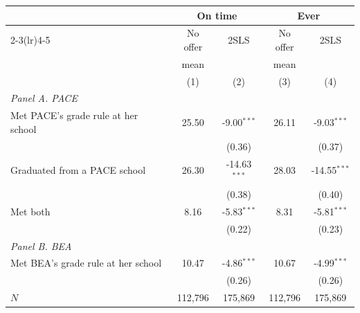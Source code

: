 \begin{tabular}{lcccc}
\toprule
 & \multicolumn{2}{c}{On time} & \multicolumn{2}{c}{Ever}\\
\cmidrule(lr){2-3}\cmidrule(lr){4-5}
 & No offer & 2SLS & No offer & 2SLS\\
 & mean &  & mean & \\
 & (1) & (2) & (3) & (4)\\
\midrule
\multicolumn{5}{l}{\textit{Panel A. PACE}}\\
\quad Met PACE's grade rule at her school & 25.50 & -9.00$^{***}$ & 26.11 & -9.03$^{***}$\\
 &  & (0.36) &  & (0.37)\\
\quad Graduated from a PACE school & 26.30 & -14.63$^{***}$ & 28.03 & -14.55$^{***}$\\
 &  & (0.38) &  & (0.40)\\
\quad Met both & 8.16 & -5.83$^{***}$ & 8.31 & -5.81$^{***}$\\
 &  & (0.22) &  & (0.23)\\
\midrule
\multicolumn{5}{l}{\textit{Panel B. BEA}}\\
\quad Met BEA's grade rule at her school & 10.47 & -4.86$^{***}$ & 10.67 & -4.99$^{***}$\\
 &  & (0.26) &  & (0.26)\\
\midrule
$N$ & 112,796 & 175,869 & 112,796 & 175,869\\
\bottomrule
\end{tabular}
